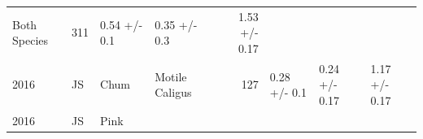 \documentclass[fleqn,10pt]{wlpeerj} %
\begin{document}
\begin{longtable}[]{@{}llllrlll@{}}
\begin{minipage}[t]{0.11\columnwidth}
Both Species\strut
\end{minipage} & \begin{minipage}[t]{0.04\columnwidth}\raggedleft\strut
311\strut
\end{minipage} & \begin{minipage}[t]{0.14\columnwidth}\raggedright\strut
0.54 +/- 0.1\strut
\end{minipage} & \begin{minipage}[t]{0.14\columnwidth}\raggedright\strut
0.35 +/- 0.3\strut
\end{minipage} & \begin{minipage}[t]{0.14\columnwidth}\raggedright\strut
1.53 +/- 0.17\strut
\end{minipage}\tabularnewline
\begin{minipage}[t]{0.09\columnwidth}\raggedright\strut
2016\strut
\end{minipage} & \begin{minipage}[t]{0.06\columnwidth}\raggedright\strut
JS\strut
\end{minipage} & \begin{minipage}[t]{0.06\columnwidth}\raggedright\strut
Chum\strut
\end{minipage} & \begin{minipage}[t]{0.11\columnwidth}\raggedright\strut
Motile Caligus\strut
\end{minipage} & \begin{minipage}[t]{0.04\columnwidth}\raggedleft\strut
127\strut
\end{minipage} & \begin{minipage}[t]{0.14\columnwidth}\raggedright\strut
0.28 +/- 0.1\strut
\end{minipage} & \begin{minipage}[t]{0.14\columnwidth}\raggedright\strut
0.24 +/- 0.17\strut
\end{minipage} & \begin{minipage}[t]{0.14\columnwidth}\raggedright\strut
1.17 +/- 0.17\strut
\end{minipage}\tabularnewline
\begin{minipage}[t]{0.09\columnwidth}\raggedright\strut
2016\strut
\end{minipage} & \begin{minipage}[t]{0.06\columnwidth}\raggedright\strut
JS\strut
\end{minipage} & \begin{minipage}[t]{0.06\columnwidth}\raggedright\strut
Pink\strut
\end{minipage} & \begin{minipage}[t]{0.11\columnwidth}\raggedright\strut

\end{minipage}
\end{longtable}
\end{document}
